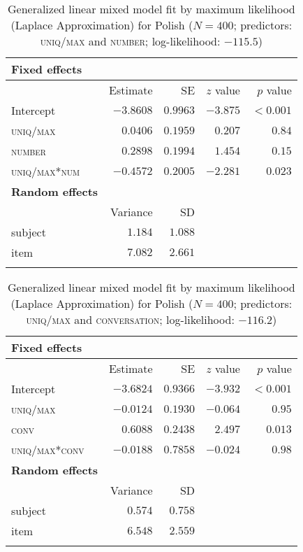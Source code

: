 \documentclass[output=paper]{langscibook}
\begin{document}
\begin{table}
    \centering
    \begin{tabular}{lrrrr}
    \lsptoprule
\textbf{Fixed effects}&\\\midrule
&            Estimate & SE & $z$ value & $p$ value\\  
Intercept               &$-3.8608$   &$0.9963$ &$-3.875$  &$<0.001$\\
\textsc{uniq/max}       &$0.0406$  &$0.1959$ &$0.207$ &$0.84$\\
\textsc{number}         &$0.2898$  &$0.1994$ &$1.454$ &$0.15$\\
\textsc{uniq/max*num}&$-0.4572$  &$0.2005$ &$-2.281$ &$0.023$\medskip\\
\textbf{Random effects}&\\\midrule
& Variance &SD\\
subject&$1.184$&$1.088$\\
item&$7.082$&$2.661$\\
\lspbottomrule
    \end{tabular}
    \caption{Generalized linear mixed model fit by maximum likelihood (Laplace Approximation) for Polish ($N=400$; predictors: \textsc{uniq/max} and \textsc{number}; log-likelihood: $-115.5$)}
    \label{sim-dem:tab:stats3pl}
\end{table}

\begin{table}
    \begin{tabular}{lrrrr}
    \lsptoprule
\textbf{Fixed effects}&\\\midrule
&            Estimate & SE & $z$ value & $p$ value\\  
Intercept               &$-3.6824$   &$0.9366$ &$-3.932$  &$<0.001$\\
\textsc{uniq/max}       &$-0.0124$  &$0.1930$ &$-0.064$ &$0.95$\\
\textsc{conv}         &$0.6088$  &$0.2438$ &$2.497$ &$0.013$\\
\textsc{uniq/max*conv}&$-0.0188$  &$0.7858$ &$-0.024$ &$0.98$\medskip\\
\textbf{Random effects}&\\\midrule
& Variance &SD\\
subject&$0.574$&$0.758$\\
item&$6.548$&$2.559$\\
\lspbottomrule
    \end{tabular}
    \caption{Generalized linear mixed model fit by maximum likelihood (Laplace Approximation) for Polish ($N=400$; predictors: \textsc{uniq/max} and \textsc{conversation}; log-likelihood: $-116.2$)}
    \label{sim-dem:tab:stats4pl}
\end{table}
\end{document}
